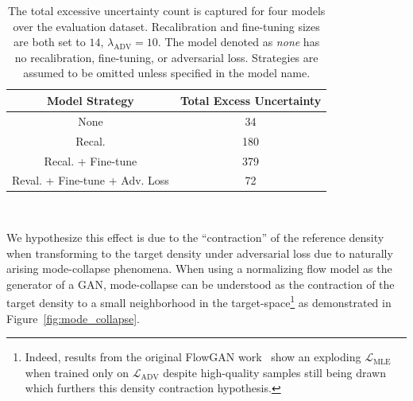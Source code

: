 \begin{table}[htb]
    \caption[Count of forecasts with excessive uncertainty]{
        The total excessive uncertainty count is captured for four models over the evaluation dataset.
        Recalibration and fine-tuning sizes are both set to $14$, $\lambda_{\text{ADV}} = 10$.
        The model denoted as \textit{none} has no recalibration, fine-tuning, or adversarial loss.
        Strategies are assumed to be omitted unless specified in the model name.
    }
    \begin{center}
        \begin{tabular}{||c|c||} \hline
        Model Strategy & Total Excess Uncertainty  \\	%
        \hline \hline
        None                            & 34 \\ \hline
        Recal.                          & 180 \\ \hline
        Recal. + Fine-tune              & 379 \\ \hline
        Reval. + Fine-tune + Adv. Loss  & 72 \\ \hline
        \end{tabular}
        \\ \rule{0mm}{5mm}
    \end{center}
    \label{tab:total_unc}
\end{table}

We hypothesize this effect is due to the ``contraction'' of the reference density when transforming to the target
density under adversarial loss due to naturally arising mode-collapse phenomena.
When using a normalizing flow model as the generator of a GAN, mode-collapse can be understood as the
contraction of the target density to a small neighborhood in the target-space\footnote{
    Indeed, results from the original FlowGAN work~\cite{flow_gan} show an exploding $\mathcal{L}_{\text{MLE}}$ when
    trained only on $\mathcal{L}_{\text{ADV}}$ despite high-quality samples still being drawn which furthers this
    density contraction hypothesis.
} as demonstrated in Figure~\ref{fig:mode_collapse}.

